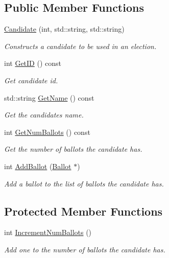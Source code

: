 \subsection*{Public Member Functions}
\begin{DoxyCompactItemize}
\item 
\hyperlink{classCandidate_a5687946f621baf578fe2391272481dc5}{Candidate} (int, std\+::string, std\+::string)
\begin{DoxyCompactList}\small\item\em Constructs a candidate to be used in an election. \end{DoxyCompactList}\item 
int \hyperlink{classCandidate_a29b844b51162c153c6f85cf817c1c9d2}{Get\+ID} () const
\begin{DoxyCompactList}\small\item\em Get candidate id. \end{DoxyCompactList}\item 
std\+::string \hyperlink{classCandidate_ad1ca1432a295579d2d61fd50a5988973}{Get\+Name} () const
\begin{DoxyCompactList}\small\item\em Get the candidate\textquotesingle{}s name. \end{DoxyCompactList}\item 
int \hyperlink{classCandidate_a966911d3f565a2d31cf9780b522340d8}{Get\+Num\+Ballots} () const
\begin{DoxyCompactList}\small\item\em Get the number of ballots the candidate has. \end{DoxyCompactList}\item 
int \hyperlink{classCandidate_af33985d301d94d4855d28b891aba1ed6}{Add\+Ballot} (\hyperlink{classBallot}{Ballot} $\ast$)
\begin{DoxyCompactList}\small\item\em Add a ballot to the list of ballots the candidate has. \end{DoxyCompactList}\end{DoxyCompactItemize}
\subsection*{Protected Member Functions}
\begin{DoxyCompactItemize}
\item 
int \hyperlink{classCandidate_a15a55468662174c8189b32fe344deb9e}{Increment\+Num\+Ballots} ()
\begin{DoxyCompactList}\small\item\em Add one to the number of ballots the candidate has. \end{DoxyCompactList}\end{DoxyCompactItemize}
